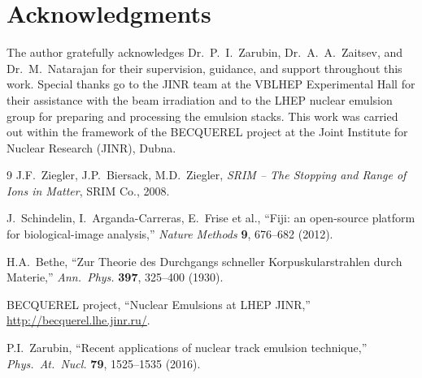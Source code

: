 \documentclass[12pt,a4paper]{article}
\begin{document}
\newpage
\section*{Acknowledgments}

The author gratefully acknowledges Dr.\ P.\ I.\ Zarubin,
Dr.\ A.\ A.\ Zaitsev, and Dr.\ M.\ Natarajan for their supervision,
guidance, and support
throughout this work. Special thanks go to the JINR team at the
VBLHEP Experimental Hall for their assistance with the beam
irradiation and to the LHEP nuclear emulsion group for preparing and
processing the emulsion stacks. This work was carried out within the
framework of the BECQUEREL project at the Joint Institute for Nuclear
Research (JINR), Dubna.

\begin{thebibliography}{9}
J.F.\ Ziegler, J.P.\ Biersack, M.D.\ Ziegler,
\textit{SRIM -- The Stopping and Range of Ions in Matter},
SRIM Co., 2008.

J.\ Schindelin, I.\ Arganda-Carreras, E.\ Frise et al.,
``Fiji: an open-source platform for biological-image analysis,''
\textit{Nature Methods} \textbf{9}, 676--682 (2012).

H.A.\ Bethe,
``Zur Theorie des Durchgangs schneller Korpuskularstrahlen durch
Materie,''
\textit{Ann.\ Phys.} \textbf{397}, 325--400 (1930).

BECQUEREL project,
``Nuclear Emulsions at LHEP JINR,''
\url{http://becquerel.lhe.jinr.ru/}.

P.I.\ Zarubin,
``Recent applications of nuclear track emulsion technique,''
\textit{Phys.\ At.\ Nucl.} \textbf{79}, 1525--1535 (2016).
\end{thebibliography}
\end{document}
